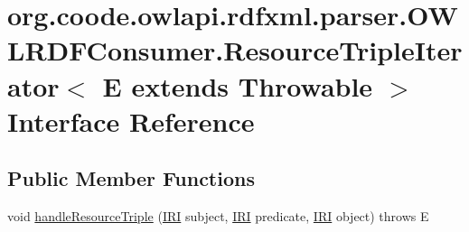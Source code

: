 \hypertarget{interfaceorg_1_1coode_1_1owlapi_1_1rdfxml_1_1parser_1_1_o_w_l_r_d_f_consumer_1_1_resource_triple4e0fef2a7cf6998cb94ca5620cceaf4b}{\section{org.\-coode.\-owlapi.\-rdfxml.\-parser.\-O\-W\-L\-R\-D\-F\-Consumer.\-Resource\-Triple\-Iterator$<$ E extends Throwable $>$ Interface Reference}
\label{interfaceorg_1_1coode_1_1owlapi_1_1rdfxml_1_1parser_1_1_o_w_l_r_d_f_consumer_1_1_resource_triple4e0fef2a7cf6998cb94ca5620cceaf4b}
}
\subsection*{Public Member Functions}
\begin{DoxyCompactItemize}
\item 
void \hyperlink{interfaceorg_1_1coode_1_1owlapi_1_1rdfxml_1_1parser_1_1_o_w_l_r_d_f_consumer_1_1_resource_triple4e0fef2a7cf6998cb94ca5620cceaf4b_aa2d152e2d9df33d32d139e5235e64deb}{handle\-Resource\-Triple} (\hyperlink{classorg_1_1semanticweb_1_1owlapi_1_1model_1_1_i_r_i}{I\-R\-I} subject, \hyperlink{classorg_1_1semanticweb_1_1owlapi_1_1model_1_1_i_r_i}{I\-R\-I} predicate, \hyperlink{classorg_1_1semanticweb_1_1owlapi_1_1model_1_1_i_r_i}{I\-R\-I} object)  throws E
\end{DoxyCompactItemize}


